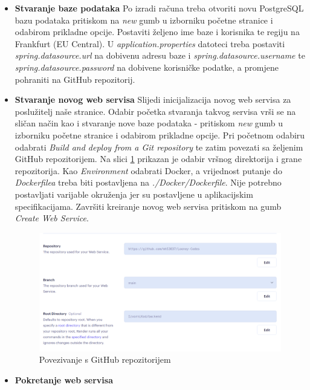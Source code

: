 \begin{itemize}
	\item \textbf{Stvaranje baze podataka} \newline
	Po izradi računa treba otvoriti novu PostgreSQL bazu podataka pritiskom na \textit{new} gumb u izborniku početne stranice i odabirom prikladne opcije. Postaviti željeno ime baze i korisnika te regiju na Frankfurt (EU Central). U \textit{application.properties} datoteci treba postaviti \textit{spring.datasource.url} na dobivenu adresu baze i \textit{spring.datasource.username} te \textit{spring.datasource.password} na dobivene korisničke podatke, a promjene pohraniti na GitHub repozitorij.
	\item \textbf{Stvaranje novog web servisa} \newline
	Slijedi inicijalizacija novog web servisa za poslužitelj naše stranice. Odabir početka stvaranja takvog servisa vrši se na sličan način kao i stvaranje nove baze podataka - pritiskom \textit{new} gumb u izborniku početne stranice i odabirom prikladne opcije.  \newline
	Pri početnom odabiru odabrati \textit{Build and deploy from a Git repository} te zatim povezati sa željenim GitHub repozitorijem. Na slici \ref{deployment3} prikazan je odabir vršnog direktorija i grane repozitorija. Kao \textit{Environment} odabrati Docker, a vrijednost putanje do \textit{Dockerfilea} treba biti postavljena na \textit{./Docker/Dockerfile}. Nije potrebno postavljati varijable okruženja jer su postavljene u aplikacijskim specifikacijama. Završiti kreiranje novog web servisa pritiskom na gumb \textit{Create Web Service}.
	\begin{figure}[H]
		\includegraphics[scale=0.3]{slike/deployment3.png}
		\centering
		\caption{Povezivanje s GitHub repozitorijem}
		\label{deployment3}
	\end{figure}
	\item \textbf{Pokretanje web servisa}

\end{itemize}
